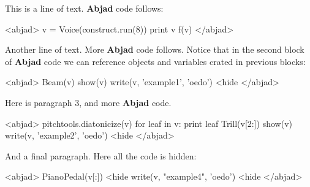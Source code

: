 \documentclass[11pt]{article}
\begin{document}
This is a line of text. \textbf{Abjad} code follows:

<abjad>
v = Voice(construct.run(8))
print v
f(v)
</abjad>

Another line of text. More \textbf{Abjad} code follows. Notice that in the second block of \textbf{Abjad} code we can reference objects and variables crated in previous blocks:

<abjad>
Beam(v)
show(v)
write(v, 'example1', 'oedo') <hide
</abjad>

Here is paragraph 3, and more \textbf{Abjad} code.

<abjad>
pitchtools.diatonicize(v)
for leaf in v: print leaf
Trill(v[2:])
show(v)
write(v, 'example2', 'oedo') <hide
</abjad>

And a final paragraph. Here all the code is hidden:

<abjad>
PianoPedal(v[:]) <hide
write(v, "example4", 'oedo') <hide
</abjad>
\end{document}
